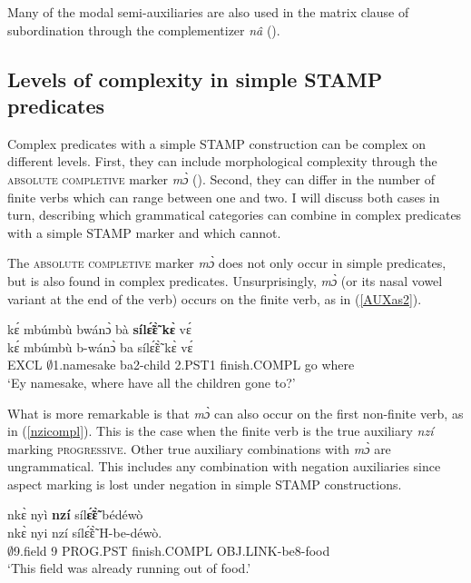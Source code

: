 \noindent Many of the modal semi-auxiliaries are also used in the matrix clause of subordination through the complementizer {\itshape nâ} ().










\subsection{Levels of complexity in simple STAMP predicates}
\label {sec:ComplMulti}

Complex predicates with a simple STAMP construction can be complex on different levels. First, they can include morphological complexity through the \textsc{absolute completive} marker {\itshape mɔ̀} (). Second, they can differ in the number of finite verbs which can range between one and two.  I will discuss both cases in turn, describing which grammatical categories can combine in complex predicates with a simple STAMP marker and which cannot.

The \textsc{absolute completive} marker {\itshape mɔ̀} does not only occur in simple predicates, but is also found in complex predicates. Unsurprisingly, {\itshape mɔ̀} (or its nasal vowel variant at the end of the verb) occurs on the finite verb, as in (\ref{AUXas2}). 

\begin{exe} 
\ex\label{AUXas2}
  \glll kɛ́ mbúmbù bwánɔ̀ bà {\bfseries sílɛ̃́ɛ̃̀} {\bfseries kɛ̀} vɛ́ \\
       kɛ́ mbúmbù b-wánɔ̀ ba sílɛ̃́ɛ̃̀ kɛ̀ vɛ́ \\
        EXCL $\emptyset$1.namesake ba2-child 2.PST1 finish.COMPL go where \\
    \trans `Ey namesake, where have all the children gone to?'
\end{exe}

\noindent What is more remarkable is that {\itshape mɔ̀} can also occur on the first non-finite verb, as in (\ref{nzicompl}). This is the case when the finite verb is the true auxiliary {\itshape nzí} marking \textsc{progressive}. Other true auxiliary combinations with {\itshape mɔ̀} are ungrammatical. This includes any combination with negation auxiliaries since aspect marking is lost under negation in simple STAMP constructions.

\begin{exe} 
\ex\label{nzicompl}
  \glll nkɛ̀ nyì {\bfseries nzí} síl{\bfseries ɛ̃́ɛ̃̀} bédéwò \\
          nkɛ̀ nyi nzí sílɛ̃́ɛ̃̀ H-be-déwò. \\
          $\emptyset$9.field 9 PROG.PST finish.COMPL OBJ.LINK-be8-food   \\
    \trans `This field was already running out of food.'
\end{exe}


